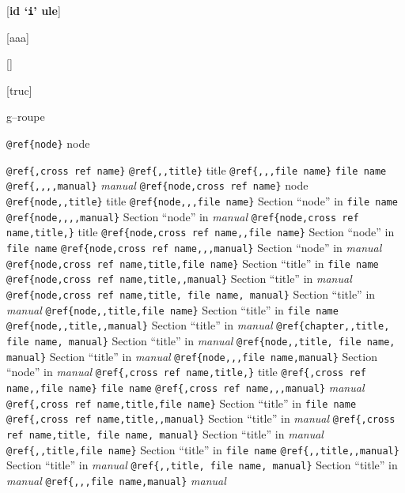 \documentclass{book}
\begin{document}
%
\noindent\texttt\bgroup{}\egroup{}\hfill[\textbf{id `\texttt{i}' ule}]




\noindent\texttt\bgroup{}\egroup{}\hfill[aaa]



\noindent\texttt\bgroup{}\egroup{}\hfill[]



\noindent\texttt\bgroup{}\egroup{}\hfill[truc]




g--roupe

\texttt{@ref\{node\}} node

\texttt{@ref\{,cross ref name\}} 
\texttt{@ref\{,,title\}} title
\texttt{@ref\{,,,file name\}} \texttt{file name}
\texttt{@ref\{,,,,manual\}} \textit{manual}
\texttt{@ref\{node,cross ref name\}} node
\texttt{@ref\{node,,title\}} title
\texttt{@ref\{node,,,file name\}} Section ``node'' in \texttt{file name}
\texttt{@ref\{node,,,,manual\}} Section ``node'' in \textit{manual}
\texttt{@ref\{node,cross ref name,title,\}} title
\texttt{@ref\{node,cross ref name,,file name\}} Section ``node'' in \texttt{file name}
\texttt{@ref\{node,cross ref name,,,manual\}} Section ``node'' in \textit{manual}
\texttt{@ref\{node,cross ref name,title,file name\}} Section ``title'' in \texttt{file name}
\texttt{@ref\{node,cross ref name,title,,manual\}} Section ``title'' in \textit{manual}
\texttt{@ref\{node,cross ref name,title, file name, manual\}} Section ``title'' in \textit{manual}
\texttt{@ref\{node,,title,file name\}} Section ``title'' in \texttt{file name}
\texttt{@ref\{node,,title,,manual\}} Section ``title'' in \textit{manual}
\texttt{@ref\{chapter,,title, file name, manual\}} Section ``title'' in \textit{manual}
\texttt{@ref\{node,,title, file name, manual\}} Section ``title'' in \textit{manual}
\texttt{@ref\{node,,,file name,manual\}} Section ``node'' in \textit{manual}
\texttt{@ref\{,cross ref name,title,\}} title
\texttt{@ref\{,cross ref name,,file name\}} \texttt{file name}
\texttt{@ref\{,cross ref name,,,manual\}} \textit{manual}
\texttt{@ref\{,cross ref name,title,file name\}} Section ``title'' in \texttt{file name}
\texttt{@ref\{,cross ref name,title,,manual\}} Section ``title'' in \textit{manual}
\texttt{@ref\{,cross ref name,title, file name, manual\}} Section ``title'' in \textit{manual}
\texttt{@ref\{,,title,file name\}} Section ``title'' in \texttt{file name}
\texttt{@ref\{,,title,,manual\}} Section ``title'' in \textit{manual}
\texttt{@ref\{,,title, file name, manual\}} Section ``title'' in \textit{manual}
\texttt{@ref\{,,,file name,manual\}} \textit{manual}
\end{document}
